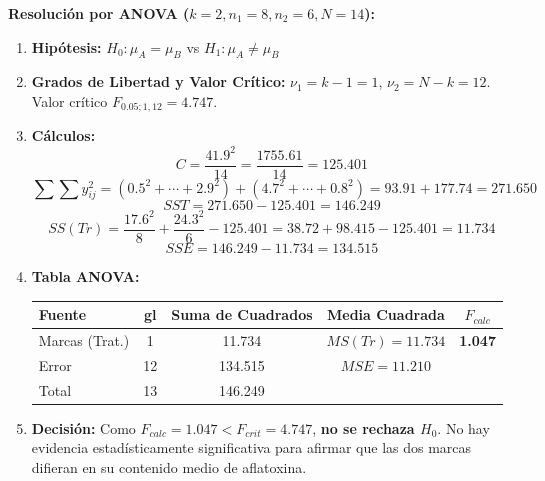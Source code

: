 \documentclass[10pt,a4paper]{article}
\begin{document}
\textbf{Resolución por ANOVA ($k=2, n_1=8, n_2=6, N=14$):}
\begin{enumerate}[leftmargin=20pt,itemsep=1pt,topsep=1pt,parsep=0pt]
  \item \textbf{Hipótesis:} $H_0: \mu_A=\mu_B$ vs $H_1: \mu_A \neq \mu_B$
  \item \textbf{Grados de Libertad y Valor Crítico:} $\nu_1=k-1=1$, $\nu_2=N-k=12$. Valor crítico $F_{0.05;1,12}=4.747$.
  \item \textbf{Cálculos:}
  \[
  C = \frac{41.9^2}{14} = \frac{1755.61}{14} = \mathbf{125.401}
  \]
  \[
  \sum\sum y_{ij}^2 = (0.5^2+\cdots+2.9^2)+(4.7^2+\cdots+0.8^2) = 93.91+177.74 = \mathbf{271.650}
  \]
  \[
  SST = 271.650-125.401 = \mathbf{146.249}
  \]
  \[
  SS(Tr) = \frac{17.6^2}{8}+\frac{24.3^2}{6}-125.401 = 38.72+98.415-125.401 = \mathbf{11.734}
  \]
  \[
  SSE = 146.249-11.734 = \mathbf{134.515}
  \]
  \item \textbf{Tabla ANOVA:}
  \begin{center}
  \vspace{-2pt}
  {\small
  \begin{tabular}{l c c c c}
  \toprule
  \textbf{Fuente} & \textbf{gl} & \textbf{Suma de Cuadrados} & \textbf{Media Cuadrada} & $F_{calc}$ \\
  \midrule
  Marcas (Trat.) & 1 & 11.734 & $MS(Tr)=11.734$ & \textbf{1.047} \\
  Error & 12 & 134.515 & $MSE=11.210$ & \\
  \midrule
  Total & 13 & 146.249 & & \\
  \bottomrule
  \end{tabular}
  }
  \end{center}
  \item \textbf{Decisión:} Como $F_{calc}=1.047 < F_{crit}=4.747$, \textbf{no se rechaza $H_0$}. No hay evidencia estadísticamente significativa para afirmar que las dos marcas difieran en su contenido medio de aflatoxina.
\end{enumerate}
\end{document}
